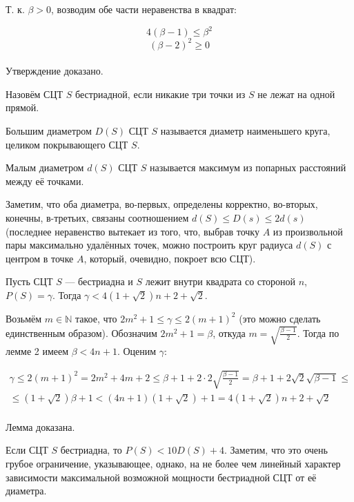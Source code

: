 \documentclass[a4paper,14pt]{article}
\begin{document}
\dokvo
	Т. к. $\beta >0$, возводим обе части неравенства в квадрат:

	$$4 (\beta - 1) \leq \beta^2$$
	$$ (\beta-2)^2 \geq 0$$
\\ Утверждение доказано.

\begin{opr}
	Назовём СЦТ $S$ бестриадной, если никакие три точки из $S$ не лежат на одной прямой.
\end{opr}

\begin{opr}
	Большим диаметром $D(S)$ СЦТ $S$ называется диаметр наименьшего круга, целиком покрывающего СЦТ $S$.
\end{opr}

\begin{opr}
	Малым диаметром $d(S)$ СЦТ $S$ называется максимум из попарных расстояний между её точками.
\end{opr}

Заметим, что оба диаметра, во-первых, определены корректно, во-вторых, конечны, в-третьих, связаны соотношением $d(S)\leq D(s) \leq 2d(s)$ (последнее неравенство вытекает из того, что, выбрав точку $A$ из произвольной пары максимально удалённых точек, можно построить круг радиуса $d(S)$ с центром в точке $A$, который, очевидно, покроет всю СЦТ).


\begin{lemma}
	Пусть СЦТ $S$ --- бестриадна и $S$ лежит внутри квадрата со стороной $n$, $P(S)=\gamma$.
	Тогда $\gamma<4(1+\sqrt{2})n+2+\sqrt{2}$.
\end{lemma}

\dokvo
	Возьмём $m \in \mathbb{N}$ такое, что $2m^2+1 \le \gamma \le 2(m+1)^2$ (это можно сделать единственным образом).
	Обозначим $2m^2+1=\beta$, откуда $m=\sqrt{\frac{\beta-1}{2}}$. Тогда по лемме 2 имеем $ \beta < 4n +1$. Оценим $\gamma$:

	\begin{multline}
		\gamma \le 2(m+1)^2 = 2m^2+4m +2 \leq
		\beta + 1 + 2 \cdot 2 \sqrt{\frac{\beta-1}{2}} =
		\beta + 1 +2\sqrt{2}\sqrt{\beta-1} \leq
		\\ \leq
		(1+\sqrt{2})\beta+1 <
		(4n+1)(1+\sqrt{2})+1 =
		4(1+\sqrt{2})n+2+\sqrt{2}
	\end{multline}
\\ Лемма доказана.

\begin{sledstvie}
	Если СЦТ $S$ бестриадна, то
	$P(S) < 10 D(S)+4$.
	Заметим, что это очень грубое ограничение, указывающее, однако,
	на не более чем линейный характер зависимости максимальной возможной мощности  бестриадной СЦТ от её диаметра.
\end{sledstvie}
\end{document}

